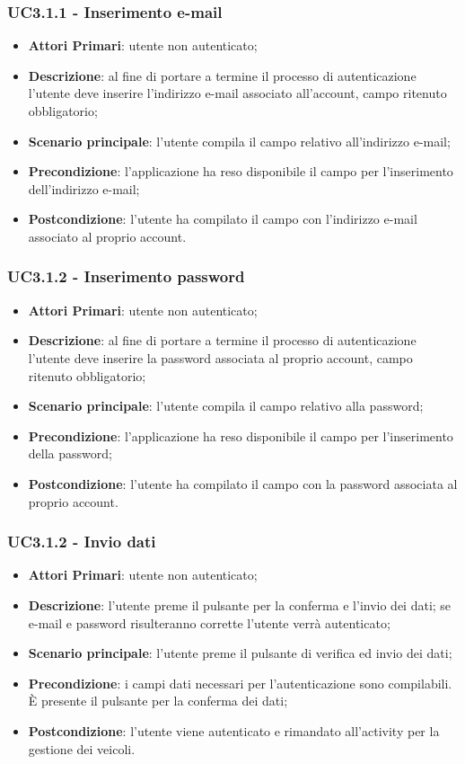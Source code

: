\subsubsection{UC3.1.1 - Inserimento e-mail}
\begin{itemize}
	\item \textbf{Attori Primari}: utente non autenticato;
	\item \textbf{Descrizione}: al fine di portare a termine il processo di autenticazione l'utente deve inserire l'indirizzo e-mail associato all'account, campo ritenuto obbligatorio;
	\item \textbf{Scenario principale}: l'utente compila il campo relativo all'indirizzo e-mail;	
	\item \textbf{Precondizione}: l'applicazione ha reso disponibile il campo per l'inserimento dell'indirizzo e-mail;
	\item \textbf{Postcondizione}: l'utente ha compilato il campo con l'indirizzo e-mail associato al proprio account.
\end{itemize}

\subsubsection{UC3.1.2 - Inserimento password}
\begin{itemize}
	\item \textbf{Attori Primari}: utente non autenticato;
	\item \textbf{Descrizione}: al fine di portare a termine il processo di autenticazione l'utente deve inserire la password associata al proprio account, campo ritenuto obbligatorio;
	\item \textbf{Scenario principale}: l'utente compila il campo relativo alla password;	
	\item \textbf{Precondizione}: l'applicazione ha reso disponibile il campo per l'inserimento della password;
	\item \textbf{Postcondizione}: l'utente ha compilato il campo con la password associata al proprio account.
\end{itemize}

\subsubsection{UC3.1.2 - Invio dati}
\begin{itemize}
	\item \textbf{Attori Primari}: utente non autenticato;
	\item \textbf{Descrizione}: l'utente preme il pulsante per la conferma e l'invio dei dati; se e-mail e password risulteranno corrette l'utente verrà autenticato;
	\item \textbf{Scenario principale}: l'utente preme il pulsante di verifica ed invio dei dati;	
	\item \textbf{Precondizione}: i campi dati necessari per l'autenticazione sono compilabili. È presente il pulsante per la conferma dei dati;
	\item \textbf{Postcondizione}: l'utente viene autenticato e rimandato all'activity per la gestione dei veicoli.
\end{itemize}

